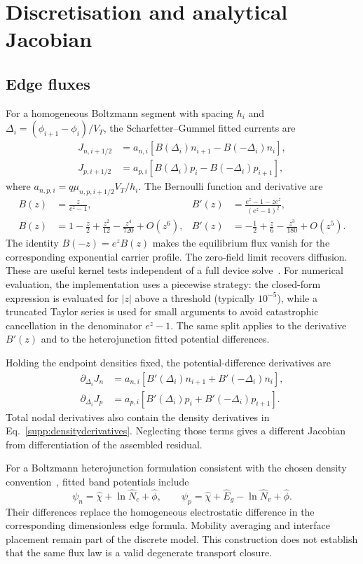 \documentclass[11pt,a4paper]{article}
\numberwithin{equation}{section}
\begin{document}
\section{Discretisation and analytical Jacobian}\label{supp:discretisation}
\subsection{Edge fluxes}
For a homogeneous Boltzmann segment with spacing $h_i$ and
$\Delta_i=(\phi_{i+1}-\phi_i)/V_T$, the Scharfetter--Gummel fitted
currents are~\cite{scharfetter1969}
\begin{align}
J_{n,i+1/2}&=a_{n,i}\left[B(\Delta_i)n_{i+1}-B(-\Delta_i)n_i\right],\\
J_{p,i+1/2}&=a_{p,i}\left[B(\Delta_i)p_i-B(-\Delta_i)p_{i+1}\right],
\end{align}
where $a_{n,p,i}=q\mu_{n,p,i+1/2}V_T/h_i$.
The Bernoulli function and derivative are
\begin{align}
B(z)&=\frac{z}{e^z-1},&
B'(z)&=\frac{e^z-1-ze^z}{(e^z-1)^2},\\
B(z)&=1-\frac z2+\frac{z^2}{12}-\frac{z^4}{720}+O(z^6),&
B'(z)&=-\frac12+\frac z6-\frac{z^3}{180}+O(z^5).
\end{align}
The identity $B(-z)=e^zB(z)$ makes the equilibrium flux vanish for
the corresponding exponential carrier profile. The zero-field limit
recovers diffusion. These are useful kernel tests independent of a full
device solve~\cite{scharfetter1969}. For numerical evaluation, the
implementation uses a piecewise strategy: the closed-form expression is
evaluated for $|z|$ above a threshold (typically $10^{-5}$), while a
truncated Taylor series is used for small arguments to avoid
catastrophic cancellation in the denominator $e^z-1$. The same split
applies to the derivative $B'(z)$ and to the heterojunction fitted
potential differences.

Holding the endpoint densities fixed, the potential-difference
derivatives are
\begin{align}
\partial_{\Delta_i}J_n
 &=a_{n,i}\left[B'(\Delta_i)n_{i+1}+B'(-\Delta_i)n_i\right],\\
\partial_{\Delta_i}J_p
 &=a_{p,i}\left[B'(\Delta_i)p_i+B'(-\Delta_i)p_{i+1}\right].
\end{align}
Total nodal derivatives also contain the density derivatives in
Eq.~\eqref{supp:densityderivatives}. Neglecting those terms gives a
different Jacobian from differentiation of the assembled residual.

For a Boltzmann heterojunction formulation consistent with the chosen
density convention~\cite{mann2022partial}, fitted band potentials include
\begin{equation}
\psi_n=\hat\chi+\ln\hat N_c+\hat\phi,\qquad
\psi_p=\hat\chi+\hat E_g-\ln\hat N_v+\hat\phi.
\end{equation}
Their differences replace the homogeneous electrostatic difference in
the corresponding dimensionless edge formula. Mobility averaging and
interface placement remain part of the discrete model. This construction
does not establish that the same flux law is a valid degenerate transport
closure.
\end{document}

